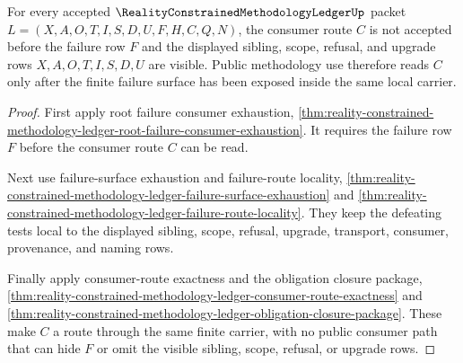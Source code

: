 \begin{theorem}
\label{thm:reality-constrained-methodology-ledger-failure-consumer-public-scope}
For every accepted $\RealityConstrainedMethodologyLedgerUp$ packet
$L=(X,A,O,T,I,S,D,U,F,H,C,Q,N)$, the consumer route $C$ is not accepted before
the failure row $F$ and the displayed sibling, scope, refusal, and upgrade rows
$X,A,O,T,I,S,D,U$ are visible. Public methodology use therefore reads $C$ only
after the finite failure surface has been exposed inside the same local
carrier.
\end{theorem}
\begin{proof}
First apply root failure consumer exhaustion,
\autoref{thm:reality-constrained-methodology-ledger-root-failure-consumer-exhaustion}.
It requires the failure row $F$ before the consumer route $C$ can be read.

Next use failure-surface exhaustion and failure-route locality,
\autoref{thm:reality-constrained-methodology-ledger-failure-surface-exhaustion}
and
\autoref{thm:reality-constrained-methodology-ledger-failure-route-locality}.
They keep the defeating tests local to the displayed sibling, scope, refusal,
upgrade, transport, consumer, provenance, and naming rows.

Finally apply consumer-route exactness and the obligation closure package,
\autoref{thm:reality-constrained-methodology-ledger-consumer-route-exactness}
and
\autoref{thm:reality-constrained-methodology-ledger-obligation-closure-package}.
These make $C$ a route through the same finite carrier, with no public
consumer path that can hide $F$ or omit the visible sibling, scope, refusal, or
upgrade rows.
\end{proof}

